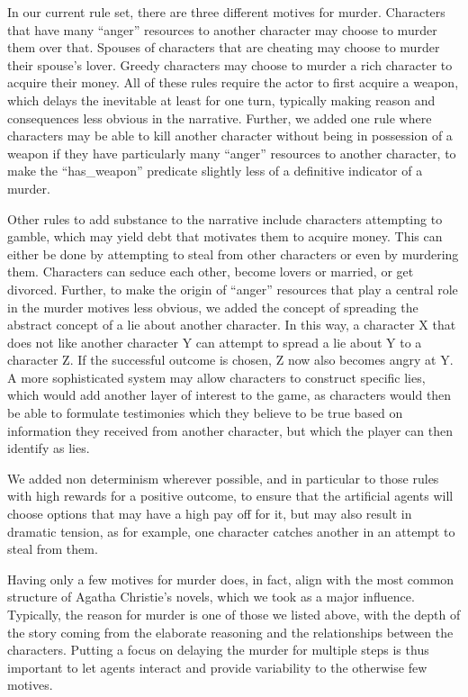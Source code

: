 In our current rule set, there are three different motives for murder.
Characters that have many \enquote{anger} resources to another character may choose to murder them over that.
Spouses of characters that are cheating may choose to murder their spouse's lover.
Greedy characters may choose to murder a rich character to acquire their money.
All of these rules require the actor to first acquire a weapon, which delays the inevitable at least for one turn, typically making reason and consequences less obvious in the narrative.
Further, we added one rule where characters may be able to kill another character without being in possession of a weapon if they have particularly many \enquote{anger} resources to another character, to make the \enquote{has\_weapon} predicate slightly less of a definitive indicator of a murder.

Other rules to add substance to the narrative include characters attempting to gamble, which may yield debt that motivates them to acquire money.
This can either be done by attempting to steal from other characters or even by murdering them.
Characters can seduce each other, become lovers or married, or get divorced.
Further, to make the origin of \enquote{anger} resources that play a central role in the murder motives less obvious, we added the concept of spreading the abstract concept of a lie about another character.
In this way, a character X that does not like another character Y can attempt to spread a lie about Y to a character Z.
If the successful outcome is chosen, Z now also becomes angry at Y.
A more sophisticated system may allow characters to construct specific lies, which would add another layer of interest to the game, as characters would then be able to formulate testimonies which they believe to be true based on information they received from another character, but which the player can then identify as lies.

We added non determinism wherever possible, and in particular to those rules with high rewards for a positive outcome, to ensure that the artificial agents will choose options that may have a high pay off for it, but may also result in dramatic tension, as for example, one character catches another in an attempt to steal from them.

Having only a few motives for murder does, in fact, align with the most common structure of Agatha Christie's novels, which we took as a major influence.
Typically, the reason for murder is one of those we listed above, with the depth of the story coming from the elaborate reasoning and the relationships between the characters.
Putting a focus on delaying the murder for multiple steps is thus important to let agents interact and provide variability to the otherwise few motives.

